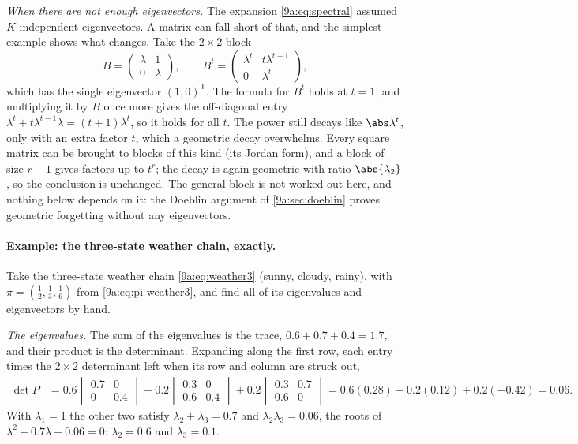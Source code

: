 \emph{When there are not enough eigenvectors.} The expansion \eqref{9a:eq:spectral} assumed
$K$ independent eigenvectors. A matrix can fall short of that, and the simplest example shows
what changes. Take the $2\times2$ block
\begin{equation*}
  B=\begin{pmatrix}\lambda&1\\0&\lambda\end{pmatrix},\qquad
  B^t=\begin{pmatrix}\lambda^t&t\lambda^{t-1}\\0&\lambda^t\end{pmatrix},
\end{equation*}
which has the single eigenvector $(1,0)^{\mathsf T}$. The formula for $B^t$ holds at $t=1$, and
multiplying it by $B$ once more gives the off-diagonal entry $\lambda^t+t\lambda^{t-1}\lambda
=(t+1)\lambda^t$, so it holds for all $t$. The power still decays like $\abs\lambda^t$, only
with an extra factor $t$, which a geometric decay overwhelms. Every square matrix can be brought
to blocks of this kind (its Jordan form), and a block of size $r+1$ gives factors up to $t^r$;
the decay is again geometric with ratio $\abs{\lambda_2}$, so the conclusion is unchanged. The
general block is not worked out here, and nothing below depends on it: the Doeblin argument of
\cref{9a:sec:doeblin} proves geometric forgetting without any eigenvectors.

\paragraph{Example: the three-state weather chain, exactly.}
Take the three-state weather chain \eqref{9a:eq:weather3} (sunny, cloudy, rainy), with
$\pi=(\tfrac12,\tfrac13,\tfrac16)$ from \eqref{9a:eq:pi-weather3}, and find all of its
eigenvalues and eigenvectors by hand.

\emph{The eigenvalues.} The sum of the eigenvalues is the trace, $0.6+0.7+0.4=1.7$, and their
product is the determinant. Expanding along the first row, each entry times the $2\times2$
determinant left when its row and column are struck out,
\begin{align*}
  \det P
  &=0.6\begin{vmatrix}0.7&0\\0&0.4\end{vmatrix}
   -0.2\begin{vmatrix}0.3&0\\0.6&0.4\end{vmatrix}
   +0.2\begin{vmatrix}0.3&0.7\\0.6&0\end{vmatrix}
   =0.6(0.28)-0.2(0.12)+0.2(-0.42)=0.06 .
\end{align*}
With $\lambda_1=1$ the other two satisfy $\lambda_2+\lambda_3=0.7$ and
$\lambda_2\lambda_3=0.06$, the roots of $\lambda^2-0.7\lambda+0.06=0$: $\lambda_2=0.6$ and
$\lambda_3=0.1$.

